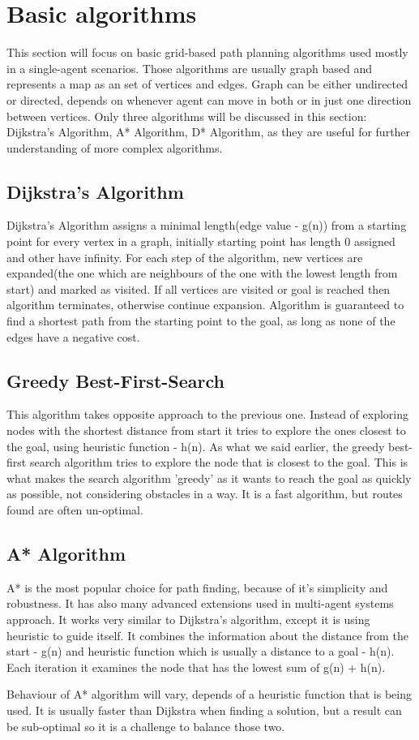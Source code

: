 
\section{Basic algorithms}

This section will focus on basic grid-based path planning algorithms used mostly in a single-agent scenarios. Those algorithms are usually graph based and represents a map as an set of vertices and edges. Graph can be either undirected or directed, depends on whenever agent can move in both or in just one direction between vertices\cite{basic_algorithms}. Only three algorithms will be discussed in this section: Dijkstra's Algorithm, A* Algorithm, D* Algorithm, as they are useful for further understanding of more complex algorithms.

\subsection{Dijkstra's Algorithm}
Dijkstra's Algorithm assigns a minimal length(edge value - g(n)) from a starting point for every vertex in a graph, initially starting point has length 0 assigned and other have infinity. For each step of the algorithm, new vertices are expanded(the one which are neighbours of the one with the lowest length from start) and marked as visited. If all vertices are visited or goal is reached then algorithm terminates, otherwise continue expansion\cite{basic_algorithms}. Algorithm is guaranteed to find a shortest path from the starting point to the goal, as long as none of the edges have a negative cost\cite{basic_2}.

\subsection{Greedy Best-First-Search}
This algorithm takes opposite approach to the previous one. Instead of exploring nodes with the shortest distance from start it tries to explore the ones closest to the goal, using heuristic function - h(n).
As what we said earlier, the greedy best-first search algorithm tries to explore the node that is closest to the goal. This is what makes the search algorithm 'greedy' as it wants to reach the goal as quickly as possible, not considering obstacles in a way. It is a fast algorithm, but routes found are often un-optimal.

\subsection{A* Algorithm}
A* is the most popular choice for path finding, because of it's simplicity and robustness. It has also many advanced extensions used in multi-agent systems approach. It works very similar to Dijkstra's algorithm, except it is using heuristic to guide itself. It combines the information about the distance from the start - g(n) and heuristic function which is usually a distance to a goal - h(n). Each iteration it examines the node that has the lowest sum of g(n) + h(n)\cite{basic_2}.

Behaviour of A* algorithm will vary, depends of a heuristic function that is being used. It is usually faster than Dijkstra when finding a solution, but a result can be sub-optimal so it is a challenge to balance those two.
